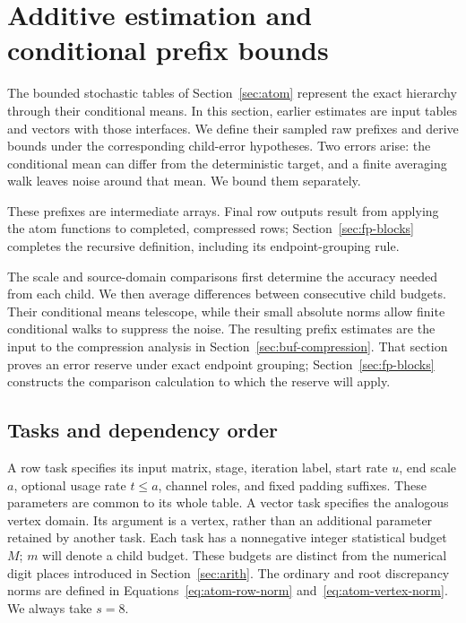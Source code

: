 \section{Additive estimation and conditional prefix bounds}
\label{sec:est}

The bounded stochastic tables of Section~\ref{sec:atom} represent the exact
hierarchy through their conditional means.  In this section, earlier
estimates are input tables and vectors with those interfaces.  We define
their sampled raw prefixes and derive bounds under the corresponding
child-error hypotheses.  Two errors arise: the conditional mean can differ
from the deterministic target, and a finite averaging walk leaves noise
around that mean.  We bound them separately.

These prefixes are intermediate arrays.  Final row outputs result from
applying the atom functions to completed, compressed rows;
Section~\ref{sec:fp-blocks} completes the recursive definition, including
its endpoint-grouping rule.

The scale and source-domain comparisons first determine the accuracy needed
from each child.  We then average differences between consecutive child
budgets.  Their conditional means telescope, while their small absolute
norms allow finite conditional walks to suppress the noise.  The resulting
prefix estimates are the input to the compression analysis in
Section~\ref{sec:buf-compression}.  That section proves an error reserve
under exact endpoint grouping; Section~\ref{sec:fp-blocks} constructs the
comparison calculation to which the reserve will apply.

\subsection{Tasks and dependency order}

A row task specifies its input matrix, stage, iteration label, start rate
$u$, end scale $a$, optional usage rate $t\le a$, channel roles, and fixed
padding suffixes.  These parameters are common to its whole table.  A
vector task specifies the analogous vertex domain.  Its argument is a
vertex, rather than an additional parameter retained by another task.
Each task has a nonnegative integer statistical budget $M$; $m$ will
denote a child budget.  These budgets are distinct from the numerical
digit places introduced in Section~\ref{sec:arith}.
The ordinary and root discrepancy norms are defined in
Equations~\eqref{eq:atom-row-norm} and~\eqref{eq:atom-vertex-norm}.
We always take $s=8$.

